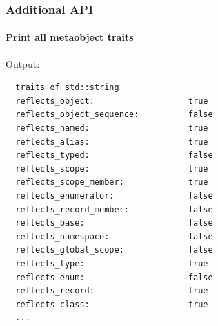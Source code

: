 \documentclass[compress,table,xcolor=table]{beamer}
\begin{document}
\begin{frame}[fragile]
  \frametitle{Additional API}
  \framesubtitle{Print all metaobject traits}
  Output:
  \footnotesize
  \begin{verbatim}
  traits of std::string
  reflects_object:                   true
  reflects_object_sequence:          false
  reflects_named:                    true
  reflects_alias:                    true
  reflects_typed:                    false
  reflects_scope:                    true
  reflects_scope_member:             true
  reflects_enumerator:               false
  reflects_record_member:            false
  reflects_base:                     false
  reflects_namespace:                false
  reflects_global_scope:             false
  reflects_type:                     true
  reflects_enum:                     false
  reflects_record:                   true
  reflects_class:                    true
  ...
  \end{verbatim}
\end{frame}
\end{document}
